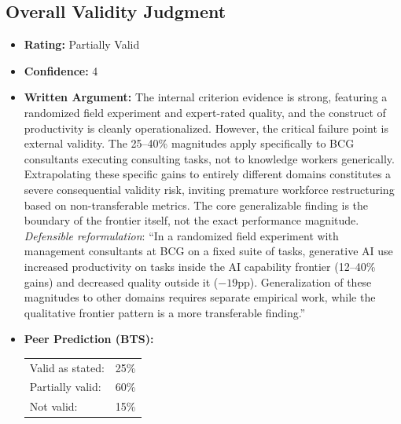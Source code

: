 \subsection{Overall Validity Judgment}
\begin{itemize}
    \item \textbf{Rating:} Partially Valid
    \item \textbf{Confidence:} 4
    \item \textbf{Written Argument:} The internal criterion evidence is strong, featuring a randomized field experiment and expert-rated quality, and the construct of productivity is cleanly operationalized. However, the critical failure point is external validity. The 25--40\% magnitudes apply specifically to BCG consultants executing consulting tasks, not to knowledge workers generically. Extrapolating these specific gains to entirely different domains constitutes a severe consequential validity risk, inviting premature workforce restructuring based on non-transferable metrics. The core generalizable finding is the boundary of the frontier itself, not the exact performance magnitude. \\
    \emph{Defensible reformulation}: ``In a randomized field experiment with management consultants at BCG on a fixed suite of tasks, generative AI use increased productivity on tasks inside the AI capability frontier (12--40\% gains) and decreased quality outside it ($-19$pp). Generalization of these magnitudes to other domains requires separate empirical work, while the qualitative frontier pattern is a more transferable finding.''
    \item \textbf{Peer Prediction (BTS):}

    \begin{tabular}{ll}
        Valid as stated: & 25\% \\
        Partially valid: & 60\% \\
        Not valid: & 15\% \\
        \end{tabular}\\[4pt]
\end{itemize}
